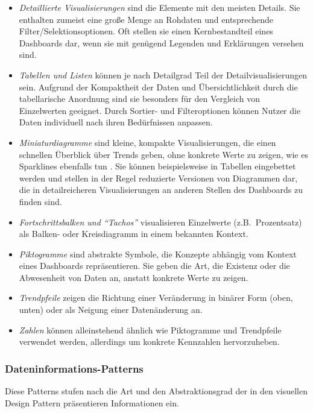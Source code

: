 \begin{itemize}
    \item \emph{Detaillierte Visualisierungen} sind die Elemente mit den meisten Details.
    Sie enthalten zumeist eine große Menge an Rohdaten und entsprechende Filter/Selektionsoptionen.
    Oft stellen sie einen Kernbestandteil eines Dashboards dar, wenn sie mit genügend Legenden und Erklärungen versehen sind.
    \item \emph{Tabellen und Listen} können je nach Detailgrad Teil der Detailvisualisierungen sein.
    Aufgrund der Kompaktheit der Daten und Übersichtlichkeit durch die tabellarische Anordnung sind sie besonders für den Vergleich von Einzelwerten geeignet.
    Durch Sortier- und Filteroptionen können Nutzer die Daten individuell nach ihren Bedürfnissen anpassen.
    \item \emph{Miniaturdiagramme} sind kleine, kompakte Visualisierungen, die einen schnellen Überblick über Trends geben, ohne konkrete Werte zu zeigen, wie es Sparklines ebenfalls tun \autocite{tufte2006beautiful.2006}.
    Sie können beispielsweise in Tabellen eingebettet werden und stellen in der Regel reduzierte Versionen von Diagrammen dar, die in detailreicheren Visualisierungen an anderen Stellen des Dashboards zu finden sind.
    \item \emph{Fortschrittsbalken und "`Tachos"'} visualisieren Einzelwerte (z.B.\ Prozentsatz) als Balken- oder Kreisdiagramm in einem bekannten Kontext.
    \item \emph{Piktogramme} sind abstrakte Symbole, die Konzepte abhängig vom Kontext eines Dashboards repräsentieren.
    Sie geben die Art, die Existenz oder die Abwesenheit von Daten an, anstatt konkrete Werte zu zeigen.
    \item \emph{Trendpfeile} zeigen die Richtung einer Veränderung in binärer Form (oben, unten) oder als Neigung einer Datenänderung an.
    \item \emph{Zahlen} können alleinstehend ähnlich wie Piktogramme und Trendpfeile verwendet werden, allerdings um konkrete Kennzahlen hervorzuheben.
\end{itemize}

\subsubsection{Dateninformations-Patterns}\label{subsubsec:data-information-patterns}

Diese Patterns stufen nach \autocite[S. 3]{Bach.DashboardDesignPatterns.2023} die Art und den Abstraktionsgrad der in den visuellen Design Pattern präsentieren Informationen ein.


